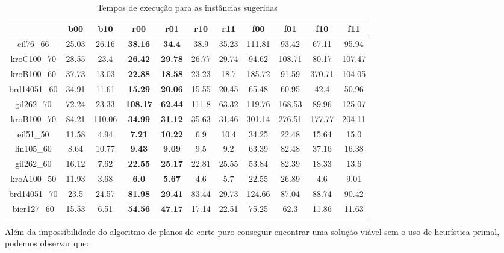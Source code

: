 \documentclass[11pt]{article}
\begin{document}
\begin{table}[htb]
\begin{tiny}
\centering
\begin{tabular}[b]{|c|c|c|c|c|c|c|c|c|c|c|}
\hline
& b00 & b10 & r00 & r01 & r10 & r11 & f00 & f01 & f10 & f11 \\ \hline
eil76\_66 & 25.03 & 26.16 & \textbf{38.16} & \textbf{34.4} & 38.9 & 35.23 & 111.81 & 93.42 & 67.11 & 95.94 \\ \hline
kroC100\_70 & 28.55 & 23.4 & \textbf{26.42} & \textbf{29.78} & 26.77 & 29.74 & 94.62 & 108.71 & 80.17 & 107.47 \\ \hline
kroB100\_60 & 37.73 & 13.03 & \textbf{22.88} & \textbf{18.58} & 23.23 & 18.7 & 185.72 & 91.59 & 370.71 & 104.05 \\ \hline
brd14051\_60 & 34.91 & 11.61 & \textbf{15.29} & \textbf{20.06} & 15.55 & 20.45 & 65.48 & 60.95 & 42.4 & 50.96 \\ \hline
gil262\_70 & 72.24 & 23.33 & \textbf{108.17} & \textbf{62.44} & 111.8 & 63.32 & 119.76 & 168.53 & 89.96 & 125.07 \\ \hline
kroB100\_70 & 84.21 & 110.06 & \textbf{34.99} & \textbf{31.12} & 35.63 & 31.46 & 301.14 & 276.51 & 177.77 & 204.11 \\ \hline
eil51\_50 & 11.58 & 4.94 & \textbf{7.21} & \textbf{10.22} & 6.9 & 10.4 & 34.25 & 22.48 & 15.64 & 15.0 \\ \hline
lin105\_60 & 8.64 & 10.77 & \textbf{9.43} & \textbf{9.09} & 9.5 & 9.2 & 63.39 & 82.48 & 37.16 & 16.38 \\ \hline
gil262\_60 & 16.12 & 7.62 & \textbf{22.55} & \textbf{25.17} & 22.81 & 25.55 & 53.84 & 82.39 & 18.33 & 13.6 \\ \hline
kroA100\_50 & 11.93 & 3.68 & \textbf{6.0} & \textbf{5.67} & 4.6 & 5.7 & 22.55 & 26.89 & 4.6 & 9.01 \\ \hline
brd14051\_70 & 23.5 & 24.57 & \textbf{81.98} & \textbf{29.41} & 83.44 & 29.73 & 124.66 & 87.04 & 88.74 & 90.42 \\ \hline
bier127\_60 & 15.53 & 6.51 & \textbf{54.56} & \textbf{47.17} & 17.14 & 22.51 & 75.25 & 62.3 & 11.86 & 11.63 \\ \hline
\end{tabular}
\end{tiny}
\caption{Tempos de execução para as instâncias sugeridas}
\label{tab:tempos}
\end{table}

Além da impossibilidade do algoritmo de planos de corte puro conseguir
encontrar uma solução viável sem o uso de heurística primal, podemos
observar que:
\end{document}
